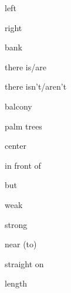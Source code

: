 \begin{flashcard}{\LARGE left}
\LARGE {}
\end{flashcard}
\begin{flashcard}{\LARGE right}
\LARGE {}
\end{flashcard}
\begin{flashcard}{\LARGE bank}
\LARGE {}
\end{flashcard}
\begin{flashcard}{\LARGE there is/are}
\LARGE {}
\end{flashcard}
\begin{flashcard}{\LARGE there isn't/aren't}
\LARGE {}
\end{flashcard}
\begin{flashcard}{\LARGE balcony}
\LARGE {}
\end{flashcard}
\begin{flashcard}{\LARGE palm trees}
\LARGE {}
\end{flashcard}
\begin{flashcard}{\LARGE center}
\LARGE {}
\end{flashcard}
\begin{flashcard}{\LARGE in front of}
\LARGE {}
\end{flashcard}
\begin{flashcard}{\LARGE but}
\LARGE {}
\end{flashcard}
\begin{flashcard}{\LARGE weak}
\LARGE {}
\end{flashcard}
\begin{flashcard}{\LARGE strong}
\LARGE {}
\end{flashcard}
\begin{flashcard}{\LARGE near (to)}
\LARGE {}
\end{flashcard}
\begin{flashcard}{\LARGE straight on}
\LARGE {}
\end{flashcard}
\begin{flashcard}{\LARGE length}
\LARGE {}
\end{flashcard}

